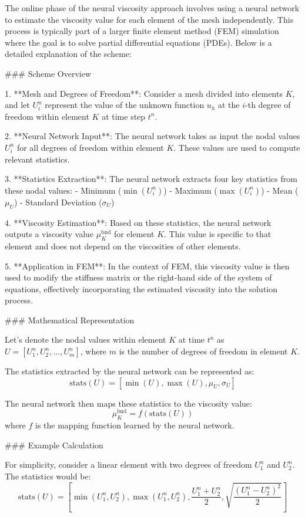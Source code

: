 The online phase of the neural viscosity approach involves using a neural network to estimate the viscosity value for each element of the mesh independently. This process is typically part of a larger finite element method (FEM) simulation where the goal is to solve partial differential equations (PDEs). Below is a detailed explanation of the scheme:

### Scheme Overview

1. **Mesh and Degrees of Freedom**: Consider a mesh divided into elements \( K \), and let \( U_i^n \) represent the value of the unknown function \( u_h \) at the \( i \)-th degree of freedom within element \( K \) at time step \( t^n \).

2. **Neural Network Input**: The neural network takes as input the nodal values \( U_i^n \) for all degrees of freedom within element \( K \). These values are used to compute relevant statistics.

3. **Statistics Extraction**: The neural network extracts four key statistics from these nodal values:
   - Minimum (\( \min(U_i^n) \))
   - Maximum (\( \max(U_i^n) \))
   - Mean (\( \mu_U \))
   - Standard Deviation (\( \sigma_U \))

4. **Viscosity Estimation**: Based on these statistics, the neural network outputs a viscosity value \( \mu_K^{\text{bnd}} \) for element \( K \). This value is specific to that element and does not depend on the viscosities of other elements.

5. **Application in FEM**: In the context of FEM, this viscosity value is then used to modify the stiffness matrix or the right-hand side of the system of equations, effectively incorporating the estimated viscosity into the solution process.

### Mathematical Representation

Let's denote the nodal values within element \( K \) at time \( t^n \) as \( U = [U_1^n, U_2^n, \ldots, U_m^n] \), where \( m \) is the number of degrees of freedom in element \( K \).

The statistics extracted by the neural network can be represented as:
\[
\text{stats}(U) = [\min(U), \max(U), \mu_U, \sigma_U]
\]

The neural network then maps these statistics to the viscosity value:
\[
\mu_K^{\text{bnd}} = f(\text{stats}(U))
\]
where \( f \) is the mapping function learned by the neural network.

### Example Calculation

For simplicity, consider a linear element with two degrees of freedom \( U_1^n \) and \( U_2^n \). The statistics would be:
\[
\text{stats}(U) = [\min(U_1^n, U_2^n), \max(U_1^n, U_2^n), \frac{U_1^n + U_2^n}{2}, \sqrt{\frac{(U_1^n - U_2^n)^2}{2}}]
\]

